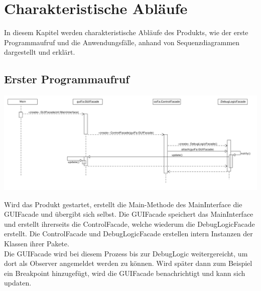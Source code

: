 \documentclass[parskip=full]{scrartcl}
\begin{document}
\section{Charakteristische Abläufe}\label{charAbl}
In diesem Kapitel werden charakteristische Abläufe des Produkts, wie der erste Programmaufruf und die
Anwendungsfälle, anhand von Sequenzdiagrammen dargestellt und erklärt.

\subsection{Erster Programmaufruf}
\begin{center}
\includegraphics[width=1.0\textwidth]{diagrammIdeenUmlet/SequenceDiagrams/seq_firstCallPDF.pdf}
\end{center}
Wird das Produkt gestartet, erstellt die Main-Methode des MainInterface die GUIFacade und übergibt sich selbst.
Die GUIFacade speichert das MainInterface und erstellt ihrerseits die ControlFacade, welche wiederum
die DebugLogicFacade erstellt.
Die ControlFacade und DebugLogicFacade erstellen intern Instanzen der Klassen ihrer Pakete. \\
Die GUIFacade wird bei diesem Prozess bis zur DebugLogic weitergereicht, um dort als Observer angemeldet werden
zu können. Wird später dann zum Beispiel ein Breakpoint hinzugefügt, wird die GUIFacade benachrichtigt und
kann sich updaten.

\newpage
\end{document}
